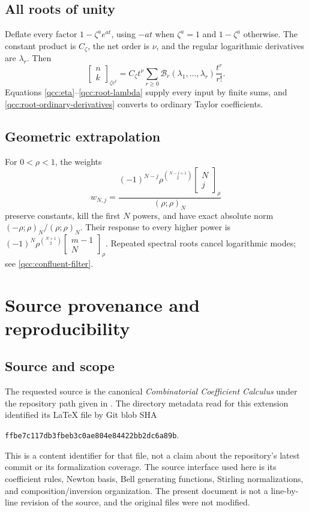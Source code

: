 \documentclass[11pt,a4paper,oneside,openany]{book}
\theoremstyle{definition}
\theoremstyle{remark}
\newcommand{\GB}[3][q]{\begin{bmatrix}#2\\#3\end{bmatrix}_{#1}}
\newcommand{\Y}[1]{\mathcal B_{#1}}
\begin{document}
\section*{All roots of unity}
Deflate every factor \(1-\zeta^ae^{at}\), using
\(-at\) when \(\zeta^a=1\) and \(1-\zeta^a\) otherwise. The constant
product is \(C_\zeta\), the net order is \(\nu\), and the regular
logarithmic derivatives are \(\lambda_r\). Then
\[
 \GB[\zeta e^t]nk=C_\zeta t^\nu
      \sum_{r\ge0}\Y r(\lambda_1,\ldots,\lambda_r)\frac{t^r}{r!}.
\]
Equations \eqref{qcc:eta}--\eqref{qcc:root-lambda} supply every input by
finite sums, and \eqref{qcc:root-ordinary-derivatives} converts to ordinary
Taylor coefficients.

\section*{Geometric extrapolation}
For \(0<\rho<1\), the weights
\[
 w_{N,j}=\frac{(-1)^{N-j}\rho^{\binom{N-j+1}{2}}
                  \GB[\rho]Nj}{(\rho;\rho)_N}
\]
preserve constants, kill the first \(N\) powers, and have exact absolute norm
\(( -\rho;\rho)_N/(\rho;\rho)_N\). Their response to every higher power
is \((-1)^N\rho^{\binom{N+1}{2}}\GB[\rho]{m-1}{N}\).
Repeated spectral roots cancel logarithmic modes; see
\cref{qcc:confluent-filter}.

\chapter{Source provenance and reproducibility}
\label{qcc:provenance}
\section{Source and scope}
The requested source is the canonical \emph{Combinatorial Coefficient Calculus}
under the repository path given in \cite{source}. The directory metadata read
for this extension identified its \LaTeX{} file by Git blob SHA
\begin{center}\small
\texttt{ffbe7c117db3fbeb3c0ae804e84422bb2dc6a89b}.
\end{center}
This is a content identifier for that file, not a claim about the repository's
latest commit or its formalization coverage. The source interface used here is
its coefficient rules, Newton basis, Bell generating functions, Stirling
normalizations, and composition/inversion organization. The present document is
not a line-by-line revision of the source, and the original files were not
modified.
\end{document}
